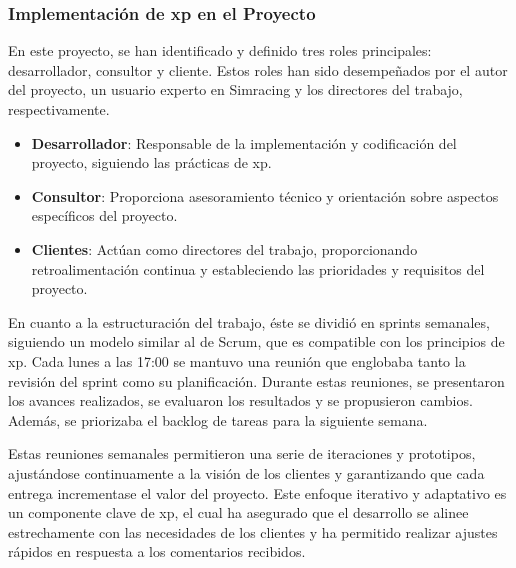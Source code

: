 \subsubsection*{Implementación de \ac{xp} en el Proyecto}
\label{sec:impl_xp}
En este proyecto, se han identificado y definido tres roles principales: desarrollador, consultor y cliente. Estos roles han sido desempeñados por el autor del proyecto, un usuario experto en Simracing y los directores del trabajo, respectivamente.

\begin{itemize}[noitemsep]
\item \textbf{Desarrollador}: Responsable de la implementación y codificación del proyecto, siguiendo las prácticas de \ac{xp}.
\item \textbf{Consultor}: Proporciona asesoramiento técnico y orientación sobre aspectos específicos del proyecto.
\item \textbf{Clientes}: Actúan como directores del trabajo, proporcionando retroalimentación continua y estableciendo las prioridades y requisitos del proyecto.
\end{itemize}

En cuanto a la estructuración del trabajo, éste se dividió en sprints semanales, siguiendo un modelo similar al de Scrum, que es compatible con los principios de \ac{xp}. Cada lunes a las 17:00 se mantuvo una reunión que englobaba tanto la revisión del sprint como su planificación. Durante estas reuniones, se presentaron los avances realizados, se evaluaron los resultados y se propusieron cambios. Además, se priorizaba el backlog de tareas para la siguiente semana.

Estas reuniones semanales permitieron una serie de iteraciones y prototipos, ajustándose continuamente a la visión de los clientes y garantizando que cada entrega incrementase el valor del proyecto. Este enfoque iterativo y adaptativo es un componente clave de \ac{xp}, el cual ha asegurado que el desarrollo se alinee estrechamente con las necesidades de los clientes y ha permitido realizar ajustes rápidos en respuesta a los comentarios recibidos.

